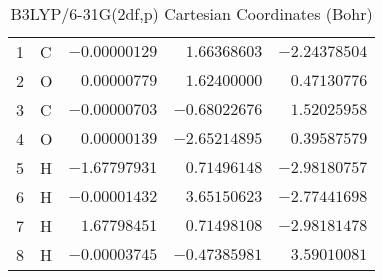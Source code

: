 \documentclass[10pt,oneside]{article}
\begin{document}
\begin{table}[h]
\centering
\caption{B3LYP/6-31G(2df,p) Cartesian Coordinates (Bohr)}
\begin{tabular}{llrrr}
\toprule
1  & C  & $-0.00000129$ & $ 1.66368603$ & $-2.24378504$ \\
2  & O  & $ 0.00000779$ & $ 1.62400000$ & $ 0.47130776$ \\
3  & C  & $-0.00000703$ & $-0.68022676$ & $ 1.52025958$ \\
4  & O  & $ 0.00000139$ & $-2.65214895$ & $ 0.39587579$ \\
5  & H  & $-1.67797931$ & $ 0.71496148$ & $-2.98180757$ \\
6  & H  & $-0.00001432$ & $ 3.65150623$ & $-2.77441698$ \\
7  & H  & $ 1.67798451$ & $ 0.71498108$ & $-2.98181478$ \\
8  & H  & $-0.00003745$ & $-0.47385981$ & $ 3.59010081$ \\
\bottomrule
\end{tabular}
\end{table}
\end{document}
